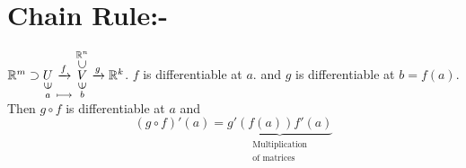 \section{Chain Rule:-}

\begin{Theorem}{}{}
	$\bbR^m\supset \underset{  \substack{{\uin} \\[0.05cm] {a}}  }{U} \underset{  \substack{\quad \\[0.25cm]\longmapsto}}{\xrightarrow{f}}   \underset{\substack{  \uin \\ b}}{  \overset{\substack{{\bbR^n} \\ \usubset}}{V}  }\xrightarrow{g}\bbR^k $. $f$ is differentiable at $a$. and $g$  is differentiable at $b=f(a)$. Then $g\circ f$ is differentiable at $a$  and $$(g\circ f)'(a)=\underbrace{g'(f(a))f'(a)}_{\substack{\text{Multiplication}\\ \text{of matrices}}}$$
\end{Theorem}

